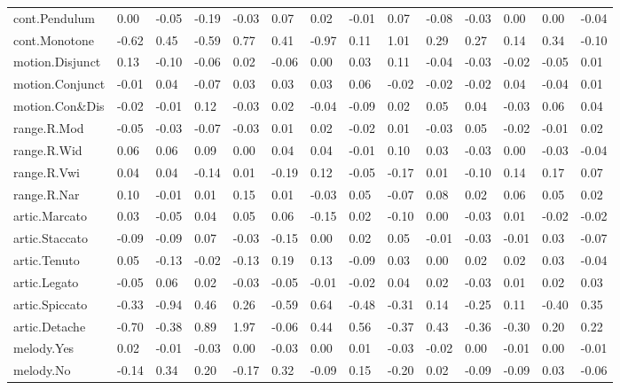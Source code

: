 \documentclass[
]{article}
\newenvironment{lltable}{\begin{landscape}\begin{center}\begin{ThreePartTable}}{\end{ThreePartTable}\end{center}\end{landscape}}
\begin{document}
\begin{lltable}
{\begin{longtable}{llllllllllllll}
cont.Pendulum & 0.00 & -0.05 & -0.19 & -0.03 & 0.07 & 0.02 & -0.01 & 0.07 & -0.08 & -0.03 & 0.00 & 0.00 & -0.04\\
cont.Monotone & -0.62 & 0.45 & -0.59 & 0.77 & 0.41 & -0.97 & 0.11 & 1.01 & 0.29 & 0.27 & 0.14 & 0.34 & -0.10\\
motion.Disjunct & 0.13 & -0.10 & -0.06 & 0.02 & -0.06 & 0.00 & 0.03 & 0.11 & -0.04 & -0.03 & -0.02 & -0.05 & 0.01\\
motion.Conjunct & -0.01 & 0.04 & -0.07 & 0.03 & 0.03 & 0.03 & 0.06 & -0.02 & -0.02 & -0.02 & 0.04 & -0.04 & 0.01\\
motion.Con\&Dis & -0.02 & -0.01 & 0.12 & -0.03 & 0.02 & -0.04 & -0.09 & 0.02 & 0.05 & 0.04 & -0.03 & 0.06 & 0.04\\
range.R.Mod & -0.05 & -0.03 & -0.07 & -0.03 & 0.01 & 0.02 & -0.02 & 0.01 & -0.03 & 0.05 & -0.02 & -0.01 & 0.02\\
range.R.Wid & 0.06 & 0.06 & 0.09 & 0.00 & 0.04 & 0.04 & -0.01 & 0.10 & 0.03 & -0.03 & 0.00 & -0.03 & -0.04\\
range.R.Vwi & 0.04 & 0.04 & -0.14 & 0.01 & -0.19 & 0.12 & -0.05 & -0.17 & 0.01 & -0.10 & 0.14 & 0.17 & 0.07\\
range.R.Nar & 0.10 & -0.01 & 0.01 & 0.15 & 0.01 & -0.03 & 0.05 & -0.07 & 0.08 & 0.02 & 0.06 & 0.05 & 0.02\\
artic.Marcato & 0.03 & -0.05 & 0.04 & 0.05 & 0.06 & -0.15 & 0.02 & -0.10 & 0.00 & -0.03 & 0.01 & -0.02 & -0.02\\
artic.Staccato & -0.09 & -0.09 & 0.07 & -0.03 & -0.15 & 0.00 & 0.02 & 0.05 & -0.01 & -0.03 & -0.01 & 0.03 & -0.07\\
artic.Tenuto & 0.05 & -0.13 & -0.02 & -0.13 & 0.19 & 0.13 & -0.09 & 0.03 & 0.00 & 0.02 & 0.02 & 0.03 & -0.04\\
artic.Legato & -0.05 & 0.06 & 0.02 & -0.03 & -0.05 & -0.01 & -0.02 & 0.04 & 0.02 & -0.03 & 0.01 & 0.02 & 0.03\\
artic.Spiccato & -0.33 & -0.94 & 0.46 & 0.26 & -0.59 & 0.64 & -0.48 & -0.31 & 0.14 & -0.25 & 0.11 & -0.40 & 0.35\\
artic.Detache & -0.70 & -0.38 & 0.89 & 1.97 & -0.06 & 0.44 & 0.56 & -0.37 & 0.43 & -0.36 & -0.30 & 0.20 & 0.22\\
melody.Yes & 0.02 & -0.01 & -0.03 & 0.00 & -0.03 & 0.00 & 0.01 & -0.03 & -0.02 & 0.00 & -0.01 & 0.00 & -0.01\\
melody.No & -0.14 & 0.34 & 0.20 & -0.17 & 0.32 & -0.09 & 0.15 & -0.20 & 0.02 & -0.09 & -0.09 & 0.03 & -0.06\\
\bottomrule
\end{longtable}

}

\end{lltable}
\end{document}
